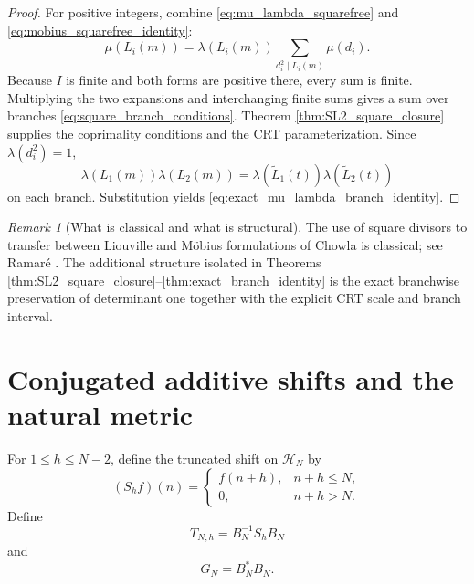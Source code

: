 \documentclass[11pt]{amsart}
\numberwithin{equation}{section}
\theoremstyle{plain}
\theoremstyle{definition}
\theoremstyle{remark}
\newtheorem{remark}[theorem]{Remark}
\newcommand{\mob}{\mu}
\newcommand{\liou}{\lambda}
\begin{document}
\begin{proof}
For positive integers, combine \eqref{eq:mu_lambda_squarefree} and \eqref{eq:mobius_squarefree_identity}:
\begin{equation}
\mob(L_i(m))
=\liou(L_i(m))\sum_{d_i^2\mid L_i(m)}\mob(d_i).
\label{eq:mu_square_expansion_form}
\end{equation}
Because $I$ is finite and both forms are positive there, every sum is finite.  Multiplying the two expansions and interchanging finite sums gives a sum over branches \eqref{eq:square_branch_conditions}.  Theorem \ref{thm:SL2_square_closure} supplies the coprimality conditions and the CRT parameterization.  Since $\liou(d_i^2)=1$,
\begin{equation}
\liou(L_1(m))\liou(L_2(m))
=\liou(\widetilde L_1(t))\liou(\widetilde L_2(t))
\label{eq:lambda_square_removal}
\end{equation}
on each branch.  Substitution yields \eqref{eq:exact_mu_lambda_branch_identity}.
\end{proof}

\begin{remark}[What is classical and what is structural]
\label{rem:ramare_transfer}
The use of square divisors to transfer between Liouville and Möbius formulations of Chowla is classical; see Ramaré \cite{Ramare2018}.  The additional structure isolated in Theorems \ref{thm:SL2_square_closure}--\ref{thm:exact_branch_identity} is the exact branchwise preservation of determinant one together with the explicit CRT scale and branch interval.
\end{remark}

\section{Conjugated additive shifts and the natural metric}
\label{sec:conjugated_shift}

For $1\le h\le N-2$, define the truncated shift on $\mathcal H_N$ by
\begin{equation}
(S_hf)(n)=
\begin{cases}
f(n+h),&n+h\le N,\\0,&n+h>N.
\end{cases}
\label{eq:shift_definition}
\end{equation}
Define
\begin{equation}
T_{N,h}=B_N^{-1}S_hB_N
\label{eq:conjugated_shift_definition}
\end{equation}
and
\begin{equation}
G_N=B_N^*B_N.
\label{eq:GN_definition}
\end{equation}
\end{document}
